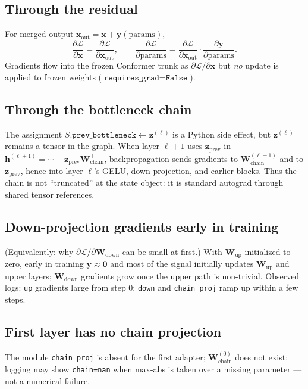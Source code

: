 \documentclass[11pt,a4paper]{article}
\begin{document}
\subsection{Through the residual}
For merged output $\bm{x}_\text{out} = \bm{x} + \bm{y}(\text{params})$,
\[
  \frac{\partial \mathcal{L}}{\partial \bm{x}} = \frac{\partial \mathcal{L}}{\partial \bm{x}_\text{out}}, \qquad
  \frac{\partial \mathcal{L}}{\partial \text{params}} = \frac{\partial \mathcal{L}}{\partial \bm{x}_\text{out}} \cdot \frac{\partial \bm{y}}{\partial \text{params}}.
\]
Gradients flow into the frozen Conformer trunk as $\partial\mathcal{L}/\partial\bm{x}$ but \emph{no} update is applied to frozen weights ($\texttt{requires\_grad}=\texttt{False}$).

\subsection{Through the bottleneck chain}
The assignment $S.\texttt{prev\_bottleneck} \gets \bm{z}^{(\ell)}$ is a Python side effect, but $\bm{z}^{(\ell)}$ remains a tensor in the graph. When layer $\ell+1$ uses $\bm{z}_\text{prev}$ in
$\bm{h}^{(\ell+1)} = \cdots + \bm{z}_\text{prev} \bm{W}_\text{chain}^\top$,
backpropagation sends gradients to $\bm{W}_\text{chain}^{(\ell+1)}$ and to $\bm{z}_\text{prev}$, hence into layer $\ell$'s GELU, down-projection, and earlier blocks. Thus the chain is not ``truncated'' at the state object: it is standard autograd through shared tensor references.

\subsection{Down-projection gradients early in training}
(Equivalently: why $\partial\mathcal{L}/\partial \bm{W}_{\text{down}}$ can be small at first.) With $\bm{W}_{\text{up}}$ initialized to zero, early in training $\bm{y}\approx\bm{0}$ and most of the signal initially updates $\bm{W}_{\text{up}}$ and upper layers; $\bm{W}_{\text{down}}$ gradients grow once the upper path is non-trivial. Observed logs: \texttt{up} gradients large from step 0; \texttt{down} and \texttt{chain\_proj} ramp up within a few steps.

\subsection{First layer has no chain projection}
The module \texttt{chain\_proj} is absent for the first adapter; $\bm{W}_\text{chain}^{(0)}$ does not exist; logging may show \texttt{chain=nan} when max-abs is taken over a missing parameter --- not a numerical failure.
\end{document}
